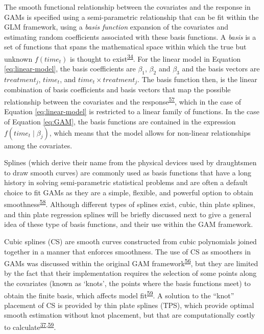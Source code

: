 \documentclass[
]{article}
\begin{document}
The smooth functional relationship between the covariates and the response in GAMs is specified using a semi-parametric relationship that can be fit within the GLM framework, using a \emph{basis function} expansion of the covariates and estimating random coefficients associated with these basis functions. A \emph{basis} is a set of functions that spans the mathematical space within which the true but unknown \(f(time_t)\) is thought to exist\textsuperscript{\protect\hyperlink{ref-simpson2018}{34}}. For the linear model in Equation \eqref{eq:linear-model}, the basis coefficients are \(\beta_1\), \(\beta_2\) and \(\beta_3\) and the basis vectors are \(treatment_j\), \(time_t\), and \(time_t \times treatment_j\). The basis function then, is the linear combination of basis coefficients and basis vectors that map the possible relationship between the covariates and the response\textsuperscript{\protect\hyperlink{ref-hefley2017}{57}}, which in the case of Equation \eqref{eq:linear-model} is restricted to a linear family of functions. In the case of Equation \eqref{eq:GAM}, the basis functions are contained in the expression \(f(time_t\mid \beta_j)\), which means that the model allows for non-linear relationships among the covariates.

Splines (which derive their name from the physical devices used by draughtsmen to draw smooth curves) are commonly used as basis functions that have a long history in solving semi-parametric statistical problems and are often a default choice to fit GAMs as they are a simple, flexible, and powerful option to obtain smoothness\textsuperscript{\protect\hyperlink{ref-wegman1983}{58}}. Although different types of splines exist, cubic, thin plate splines, and thin plate regression splines will be briefly discussed next to give a general idea of these type of basis functions, and their use within the GAM framework.

Cubic splines (CS) are smooth curves constructed from cubic polynomials joined together in a manner that enforces smoothness. The use of CS as smoothers in GAMs was discussed within the original GAM framework\textsuperscript{\protect\hyperlink{ref-hastie1987}{56}}, but they are limited by the fact that their implementation requires the selection of some points along the covariates (known as `knots', the points where the basis functions meet) to obtain the finite basis, which affects model fit\textsuperscript{\protect\hyperlink{ref-wood2003}{59}}. A solution to the ``knot'' placement of CS is provided by thin plate splines (TPS), which provide optimal smooth estimation without knot placement, but that are computationally costly to calculate\textsuperscript{\protect\hyperlink{ref-wood2017}{37},\protect\hyperlink{ref-wood2003}{59}}.
\end{document}
